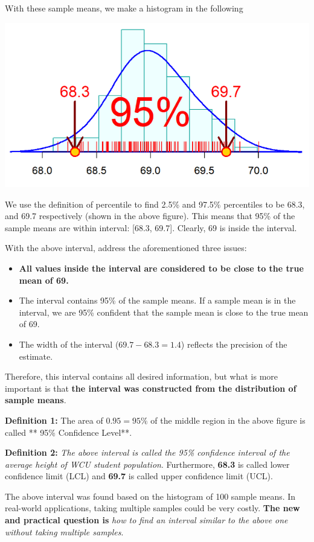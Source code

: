 \documentclass[
]{book}
\begin{document}
With these sample means, we make a histogram in the following

\begin{center}\includegraphics[width=0.6\linewidth]{week06/example03} \end{center}

We use the definition of percentile to find 2.5\% and 97.5\% percentiles to be 68.3, and 69.7 respectively (shown in the above figure). This means that 95\% of the sample means are within interval: {[}68.3, 69.7{]}. Clearly, 69 is inside the interval.

With the above interval, address the aforementioned three issues:

\begin{itemize}
\item
  \textbf{All values inside the interval are considered to be close to the true mean of 69.}
\item
  The interval contains 95\% of the sample means. If a sample mean is in the interval, we are 95\% confident that the sample mean is close to the true mean of 69.
\item
  The width of the interval (\(69.7 - 68.3 = 1.4\)) reflects the precision of the estimate.
\end{itemize}

Therefore, this interval contains all desired information, but what is more important is that \textbf{the interval was constructed from the distribution of sample means}.

\textbf{Definition 1: } The area of \(0.95 = 95\%\) of the middle region in the above figure is called ** 95\% Confidence Level**.

\textbf{Definition 2: } \emph{The above interval is called the 95\% confidence interval of the average height of WCU student population}. Furthermore, \textbf{68.3} is called lower confidence limit (LCL) and \textbf{69.7} is called upper confidence limit (UCL).

The above interval was found based on the histogram of 100 sample means. In real-world applications, taking multiple samples could be very costly. \textbf{The new and practical question is} \emph{how to find an interval similar to the above one without taking multiple samples}.
\end{document}
